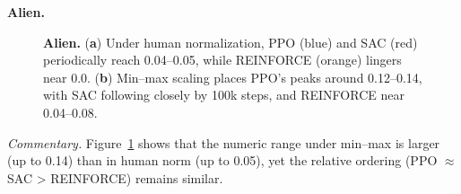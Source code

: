 \noindent \textbf{Alien.}
\begin{figure}[htbp]
	\centering
	\quad
	\caption{\textbf{Alien.} 
		(\textbf{a}) Under human normalization, PPO (blue) and SAC (red) periodically reach 0.04--0.05, while REINFORCE (orange) lingers near 0.0.
		(\textbf{b}) Min--max scaling places PPO’s peaks around 0.12--0.14, with SAC following closely by 100k steps, and REINFORCE near 0.04--0.08.}
	\label{fig:alien_combined}
\end{figure}

\noindent
\emph{Commentary.} Figure~\ref{fig:alien_combined} shows that the numeric range under min--max is larger (up to 0.14) than in human norm (up to 0.05), yet the relative ordering (PPO \(\approx\) SAC > REINFORCE) remains similar.

\medskip

